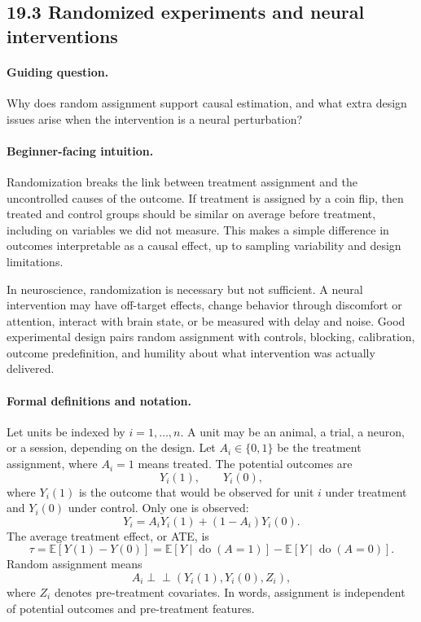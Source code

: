 \subsection{19.3 Randomized experiments and neural interventions}

\paragraph{Guiding question.}
Why does random assignment support causal estimation, and what extra design issues arise when the intervention is a neural perturbation?

\paragraph{Beginner-facing intuition.}
Randomization breaks the link between treatment assignment and the uncontrolled causes of the outcome. If treatment is assigned by a coin flip, then treated and control groups should be similar on average before treatment, including on variables we did not measure. This makes a simple difference in outcomes interpretable as a causal effect, up to sampling variability and design limitations.

In neuroscience, randomization is necessary but not sufficient. A neural intervention may have off-target effects, change behavior through discomfort or attention, interact with brain state, or be measured with delay and noise. Good experimental design pairs random assignment with controls, blocking, calibration, outcome predefinition, and humility about what intervention was actually delivered.

\paragraph{Formal definitions and notation.}
Let units be indexed by \(i=1,\ldots,n\). A unit may be an animal, a trial, a neuron, or a session, depending on the design. Let \(A_i\in\{0,1\}\) be the treatment assignment, where \(A_i=1\) means treated. The potential outcomes are
\[
Y_i(1),\qquad Y_i(0),
\]
where \(Y_i(1)\) is the outcome that would be observed for unit \(i\) under treatment and \(Y_i(0)\) under control. Only one is observed:
\[
Y_i=A_iY_i(1)+(1-A_i)Y_i(0).
\]
The average treatment effect, or ATE, is
\[
\tau=\mathbb E[Y(1)-Y(0)]
=\mathbb E[Y\mid \operatorname{do}(A=1)]-\mathbb E[Y\mid \operatorname{do}(A=0)].
\]
Random assignment means
\[
A_i\perp\!\!\!\perp (Y_i(1),Y_i(0),Z_i),
\]
where \(Z_i\) denotes pre-treatment covariates. In words, assignment is independent of potential outcomes and pre-treatment features.

